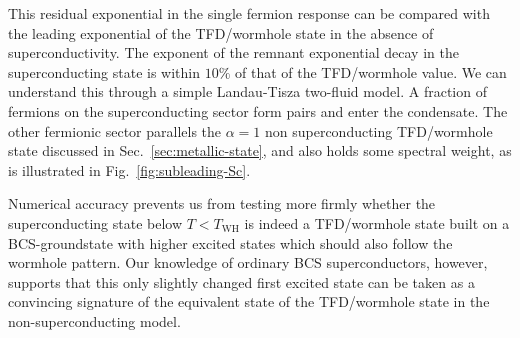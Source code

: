 %
This residual exponential in the single fermion response can be compared with the leading exponential of the TFD/wormhole state in the absence of superconductivity. The exponent of the remnant exponential decay in the superconducting state is within $10\%$ of that of the TFD/wormhole value. 
We can understand this through a simple Landau-Tisza two-fluid model. A fraction of fermions on the superconducting sector form pairs and enter the condensate. The other fermionic sector parallels the $\alpha=1$ non superconducting TFD/wormhole state discussed in Sec.~\ref{sec:metallic-state}, and also holds some spectral weight, as is illustrated in Fig.~\ref{fig:subleading-Sc}.

Numerical accuracy prevents us from testing more firmly whether the superconducting state below $T<T_{\text{WH}}$ is indeed a TFD/wormhole state built on a BCS-groundstate with higher excited states which should also follow the wormhole pattern. Our knowledge of ordinary BCS superconductors, however, supports that this only slightly changed first excited state can be taken as a convincing signature of the equivalent state of the TFD/wormhole state in the non-superconducting model. 



